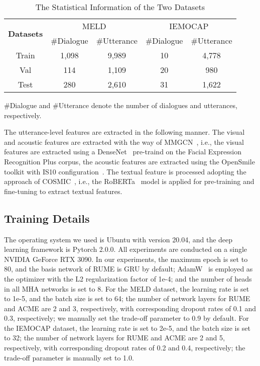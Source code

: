 \documentclass[journal]{IEEEtran}
\begin{document}
\begin{table}[htbp]
    \centering
    \renewcommand{\arraystretch}{1.0}
    \setlength{\tabcolsep}{4pt}
    \caption{The Statistical Information of the Two Datasets}
    \begin{threeparttable}
    \begin{tabular}{c|cccc}
    \hline
    \multirow{2}{*}{\textbf{Datasets}} &\multicolumn{2}{c}{MELD} &\multicolumn{2}{c}{IEMOCAP} \\
           &\#Dialogue &\#Utterance &\#Dialogue &\#Utterance \\ 
    \hline
    Train &1,098 &9,989 &10 &4,778  \\
    Val &114 &1,109 &20 &980 \\
    Test &280 &2,610 &31 &1,622 \\
    \hline
    \end{tabular}
    \begin{tablenotes}
        \footnotesize
        \item \#Dialogue and \#Utterance denote the number of dialogues and utterances, respectively.
    \end{tablenotes}
    \end{threeparttable}
    \label{tab:statistics}
\end{table}

The utterance-level features are extracted in the following manner. The visual and acoustic features are extracted with the way of MMGCN~\cite{hu2021mmgcn}, i.e., the visual features are extracted using a DenseNet~\cite{huang2017densely} pre-traind on the Facial Expression Recognition Plus corpus\cite{barsoum2016training}, the acoustic features are extracted using the OpenSmile toolkit with IS10 configuration~\cite{schuller2011recognising}. The textual feature is processed adopting the approach of COSMIC~\cite{ghosal2020cosmic}, i.e., the RoBERTa~\cite{liu2020roberta} model is applied for pre-training and fine-tuning to extract textual features.

\subsection{Training Details}
The operating system we used is Ubuntu with version 20.04, and the deep learning framework is Pytorch 2.0.0. All experiments are conducted on a single NVIDIA GeForce RTX 3090. In our experiments, the maximum epoch is set to 80, and the basis network of RUME is GRU by default; AdamW~\cite{loshchilov2018decoupled} is employed as the optimizer with the L2 regularization factor of 1e-4; and the number of heads in all MHA networks is set to 8. For the MELD dataset, the learning rate is set to 1e-5, and the batch size is set to 64; the number of network layers for RUME and ACME are 2 and 3, respectively, with corresponding dropout rates of 0.1 and 0.3, respectively; we manually set the trade-off parameter  to 0.9 by default. For the IEMOCAP dataset, the learning rate is set to 2e-5, and the batch size is set to 32; the number of network layers for RUME and ACME are 2 and 5, respectively, with corresponding dropout rates of 0.2 and 0.4, respectively; the trade-off parameter  is manually set to 1.0. 
\end{document}
